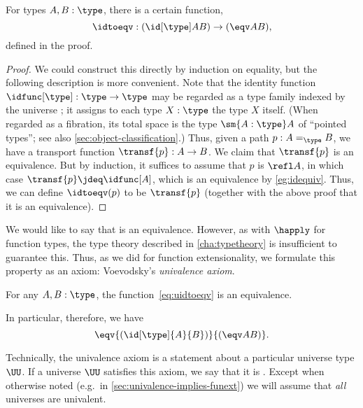 \begin{lem}\label{thm:idtoeqv}
  For types $A,B:\type$, there is a certain function,
  \begin{equation}\label{eq:uidtoeqv}
    \idtoeqv : (\id[\type]AB) \to (\eqv A B),
  \end{equation}
  defined in the proof.
\end{lem}
\begin{proof}
  We could construct this directly by induction on equality, but the following description is more convenient.
  Note that the identity function $\idfunc[\type]:\type\to\type$ may be regarded as a type family indexed by the universe \type; it assigns to each type $X:\type$ the type $X$ itself.
  (When regarded as a fibration, its total space is the type $\sm{A:\type}A$ of ``pointed types''; see also \cref{sec:object-classification}.)
  Thus, given a path $p:A =_\type B$, we have a transport function $\transf{p}:A \to B$.
  We claim that $\transf{p}$ is an equivalence.
  But by induction, it suffices to assume that $p$ is $\refl A$, in which case $\transf{p} \jdeq \idfunc[A]$, which is an equivalence by \cref{eg:idequiv}.
  Thus, we can define $\idtoeqv(p)$ to be $\transf{p}$ (together with the above proof that it is an equivalence).
\end{proof}

We would like to say that \idtoeqv is an equivalence.
However, as with $\happly$ for function types, the type theory described in \cref{cha:typetheory} is insufficient to guarantee this.
Thus, as we did for function extensionality, we formulate this property as an axiom: Voevodsky's \emph{univalence axiom}.

\begin{axiom}[Univalence]\label{axiom:univalence}
  For any $A,B:\type$, the function~\eqref{eq:uidtoeqv} is an equivalence.
\end{axiom}

In particular, therefore, we have
  \[
\eqv{(\id[\type]{A}{B})}{(\eqv A B)}.
\]

Technically, the univalence axiom is a statement about a particular universe type $\UU$.
If a universe $\UU$ satisfies this axiom, we say that it is .
%
%
Except when otherwise noted (e.g.\ in \cref{sec:univalence-implies-funext}) we will assume that \emph{all} universes are univalent.

